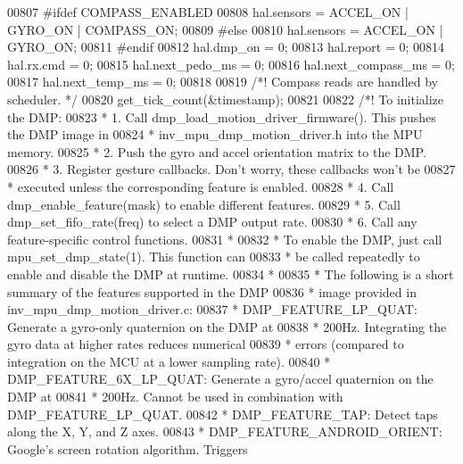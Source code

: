 \begin{DoxyCode}
{{{{{{{{00807 \textcolor{preprocessor}{#}\textcolor{preprocessor}{ifdef} \textcolor{preprocessor}{COMPASS\_ENABLED}
00808     hal.sensors = ACCEL\_ON | GYRO\_ON | COMPASS\_ON;
00809 \textcolor{preprocessor}{#}\textcolor{preprocessor}{else}
00810     hal.sensors = ACCEL_ON | GYRO_ON;
00811 \textcolor{preprocessor}{#}\textcolor{preprocessor}{endif}
00812     hal.dmp_on = 0;
00813     hal.report = 0;
00814     hal.rx.cmd = 0;
00815     hal.next_pedo_ms = 0;
00816     hal.next_compass_ms = 0;
00817     hal.next_temp_ms = 0;
00818 
00819   \textcolor{comment}{/*! Compass reads are handled by scheduler. */}
00820   get_tick_count(&timestamp);
00821 
00822     \textcolor{comment}{/*! To initialize the DMP:}
00823 \textcolor{comment}{     * 1. Call dmp\_load\_motion\_driver\_firmware(). This pushes the DMP image in}
00824 \textcolor{comment}{     *    inv\_mpu\_dmp\_motion\_driver.h into the MPU memory.}
00825 \textcolor{comment}{     * 2. Push the gyro and accel orientation matrix to the DMP.}
00826 \textcolor{comment}{     * 3. Register gesture callbacks. Don't worry, these callbacks won't be}
00827 \textcolor{comment}{     *    executed unless the corresponding feature is enabled.}
00828 \textcolor{comment}{     * 4. Call dmp\_enable\_feature(mask) to enable different features.}
00829 \textcolor{comment}{     * 5. Call dmp\_set\_fifo\_rate(freq) to select a DMP output rate.}
00830 \textcolor{comment}{     * 6. Call any feature-specific control functions.}
00831 \textcolor{comment}{     *}
00832 \textcolor{comment}{     * To enable the DMP, just call mpu\_set\_dmp\_state(1). This function can}
00833 \textcolor{comment}{     * be called repeatedly to enable and disable the DMP at runtime.}
00834 \textcolor{comment}{     *}
00835 \textcolor{comment}{     * The following is a short summary of the features supported in the DMP}
00836 \textcolor{comment}{     * image provided in inv\_mpu\_dmp\_motion\_driver.c:}
00837 \textcolor{comment}{     * DMP\_FEATURE\_LP\_QUAT: Generate a gyro-only quaternion on the DMP at}
00838 \textcolor{comment}{     * 200Hz. Integrating the gyro data at higher rates reduces numerical}
00839 \textcolor{comment}{     * errors (compared to integration on the MCU at a lower sampling rate).}
00840 \textcolor{comment}{     * DMP\_FEATURE\_6X\_LP\_QUAT: Generate a gyro/accel quaternion on the DMP at}
00841 \textcolor{comment}{     * 200Hz. Cannot be used in combination with DMP\_FEATURE\_LP\_QUAT.}
00842 \textcolor{comment}{     * DMP\_FEATURE\_TAP: Detect taps along the X, Y, and Z axes.}
00843 \textcolor{comment}{     * DMP\_FEATURE\_ANDROID\_ORIENT: Google's screen rotation algorithm. Triggers}
}}}}}}}}
\end{DoxyCode}

